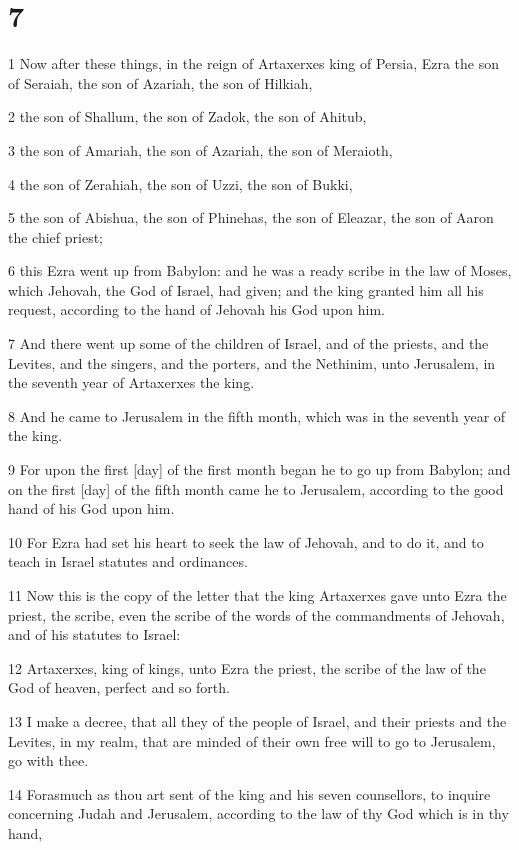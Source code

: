 \chapter{7}

\par 1 Now after these things, in the reign of Artaxerxes king of Persia, Ezra the son of Seraiah, the son of Azariah, the son of Hilkiah,
\par 2 the son of Shallum, the son of Zadok, the son of Ahitub,
\par 3 the son of Amariah, the son of Azariah, the son of Meraioth,
\par 4 the son of Zerahiah, the son of Uzzi, the son of Bukki,
\par 5 the son of Abishua, the son of Phinehas, the son of Eleazar, the son of Aaron the chief priest;
\par 6 this Ezra went up from Babylon: and he was a ready scribe in the law of Moses, which Jehovah, the God of Israel, had given; and the king granted him all his request, according to the hand of Jehovah his God upon him.
\par 7 And there went up some of the children of Israel, and of the priests, and the Levites, and the singers, and the porters, and the Nethinim, unto Jerusalem, in the seventh year of Artaxerxes the king.
\par 8 And he came to Jerusalem in the fifth month, which was in the seventh year of the king.
\par 9 For upon the first [day] of the first month began he to go up from Babylon; and on the first [day] of the fifth month came he to Jerusalem, according to the good hand of his God upon him.
\par 10 For Ezra had set his heart to seek the law of Jehovah, and to do it, and to teach in Israel statutes and ordinances.
\par 11 Now this is the copy of the letter that the king Artaxerxes gave unto Ezra the priest, the scribe, even the scribe of the words of the commandments of Jehovah, and of his statutes to Israel:
\par 12 Artaxerxes, king of kings, unto Ezra the priest, the scribe of the law of the God of heaven, perfect and so forth.
\par 13 I make a decree, that all they of the people of Israel, and their priests and the Levites, in my realm, that are minded of their own free will to go to Jerusalem, go with thee.
\par 14 Forasmuch as thou art sent of the king and his seven counsellors, to inquire concerning Judah and Jerusalem, according to the law of thy God which is in thy hand,
